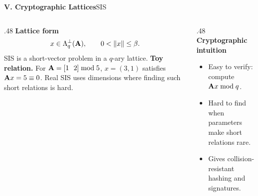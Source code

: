 \begin{frame}[shrink=5]{\textbf{V. Cryptographic Lattices}}{SIS}
\begin{columns}[T,onlytextwidth]
\begin{column}{.48\textwidth}
\textcolor{TealDarkCyan}{\textbf{Lattice form}}
\[
  x\in\Lambda_q^\perp(\mathbf{A}),\qquad 0<\left\lVert x\right\rVert\le \beta.
\]
SIS is a short-vector problem in a $q$-ary lattice.
\textbf{Toy relation.}\; For $\mathbf{A}=[1\ \ 2]\bmod5$, $x=(3,1)$ satisfies $\mathbf{A} x=5\equiv0$.
Real SIS uses dimensions where finding such short relations is hard.
\end{column}
\begin{column}{.48\textwidth}
\textcolor{TealDarkCyan}{\textbf{Cryptographic intuition}}
\begin{itemize}
  \item Easy to verify: compute $\mathbf{A} x\bmod q$.
  \item Hard to find when parameters make short relations rare.
  \item Gives collision-resistant hashing and signatures.
\end{itemize}
\end{column}
\end{columns}
\end{frame}

